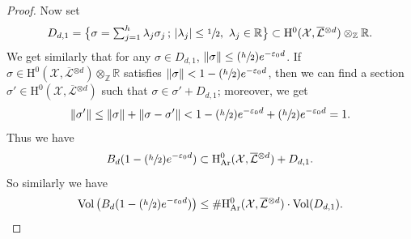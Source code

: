 \documentclass[11pt]{article}
\numberwithin{equation}{section}
\newcommand{\Psfrac}[2]{(\sfrac{#1}{#2})}
\newcommand{\sep}{\,;\,}
\theoremstyle{plain}
\theoremstyle{definition}
\newcommand{\ho}{\mathrm{H}}
\newcommand{\X}{\mathcal{X}}
\newcommand{\Li}{\overline{\mathcal{L}}{}}
\begin{document}
\begin{proof}[Proof]
Now set
\[\textstyle
D_{d,1}=\bigl\{ \sigma=\sum_{j=1}^{h}\lambda_j \sigma_j\sep |\lambda_j|\leq \sfrac{1}{2},\ \lambda_j\in \mathbb{R} \bigr\}\subset \ho^0(\X,\Li^{\otimes d})\otimes_{ \mathbb{Z}}\mathbb{R}.
\]
We get similarly that for any $\sigma\in D_{d,1}$, $\lVert \sigma\rVert \leq \Psfrac{h}{2}e^{-\varepsilon_0 d}$.
If $\sigma\in \ho^0(\X,\Li^{\otimes d})\otimes_{ \mathbb{Z}}\mathbb{R}$ satisfies $\lVert\sigma\rVert <1-\Psfrac{h}{2}e^{-\varepsilon_0 d}$, then we can find a section $\sigma'\in \ho^0(\X,\Li^{\otimes d})$ such that $\sigma\in \sigma'+D_{d, 1}$; moreover, we get
\[
\lVert \sigma' \rVert \leq \lVert \sigma \rVert + \lVert \sigma-\sigma' \rVert <1-\Psfrac{h}{2}e^{-\varepsilon_0 d}+\Psfrac{h}{2}e^{-\varepsilon_0 d}=1.
\]
Thus we have
\[
B_d(1-\Psfrac{h}{2}e^{-\varepsilon_0 d})\subset \ho^0_{\mathrm{Ar}}(\X,\Li^{\otimes d})+D_{d,1}.
\]
So similarly we have
\[
\mathrm{Vol} \left(B_d(1-\Psfrac{h}{2}e^{-\varepsilon_0 d}) \right)\leq \#\ho^0_{\mathrm{Ar}}(\X,\Li^{\otimes d})\cdot \mathrm{Vol}(D_{d,1}).
\]


\end{proof}
\end{document}
